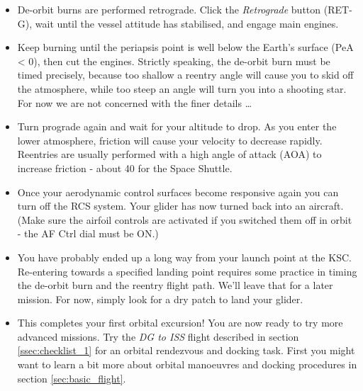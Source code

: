 \documentclass[Orbiter User Manual.tex]{subfiles}
\begin{document}
\begin{itemize}
	\item De-orbit burns are performed retrograde. Click the \emph{Retrograde}
		button (RET-G), wait until the vessel attitude has stabilised, and
		engage main engines.
	\item Keep burning until the periapsis point is well below the Earth's
		surface (PeA < 0), then cut the engines. Strictly speaking, the de-orbit
		burn must be timed precisely, because too shallow a reentry angle will
		cause you to skid off the atmosphere, while too steep an angle will turn
		you into a shooting star. For now we are not concerned with the finer
		details \ldots
	\item Turn prograde again and wait for your altitude to drop. As you enter
		the lower atmosphere, friction will cause your velocity to decrease
		rapidly. Reentries are usually performed with a high angle of attack
		(AOA) to increase friction - about 40\deg{} for the Space Shuttle.
	\item Once your aerodynamic control surfaces become responsive again you can
		turn off the RCS system. Your glider has now turned back into an
		aircraft. (Make sure the airfoil controls are activated if you switched
		them off in orbit - the AF Ctrl dial must be ON.)
	\item You have probably ended up a long way from your launch point at the
		KSC. Re-entering towards a specified landing point requires some
		practice in timing the de-orbit burn and the reentry flight path. We'll
		leave that for a later mission. For now, simply look for a dry patch to
		land your glider.
	\item This completes your first orbital excursion! You are now ready to try
		more advanced missions. Try the \emph{DG to ISS} flight described in
		section \ref{ssec:checklist_1} for an orbital rendezvous and docking
		task. First you might want to learn a bit more about orbital manoeuvres
		and docking procedures in section \ref{sec:basic_flight}.
\end{itemize}
\end{document}
